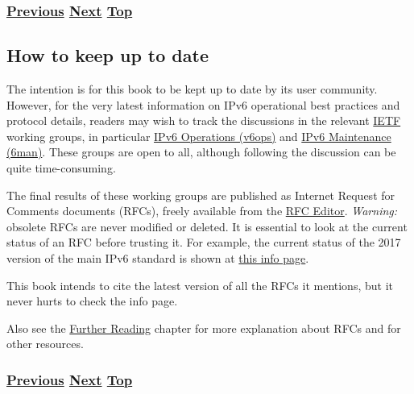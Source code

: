 \documentclass[
]{article}
\begin{document}
\subsubsection{\texorpdfstring{\hyperref[how-an-application-programmer-sees-ipv6]{Previous}
\hyperref[how-to-keep-up-to-date]{Next}
\hyperref[introduction-and-foreword]{Top}}{Previous Next Top}}\label{previous-next-top-3}

\pagebreak

\subsection{How to keep up to date}\label{how-to-keep-up-to-date}

The intention is for this book to be kept up to date by its user
community. However, for the very latest information on IPv6 operational
best practices and protocol details, readers may wish to track the
discussions in the relevant \href{https://www.ietf.org}{IETF} working
groups, in particular
\href{https://datatracker.ietf.org/wg/v6ops/about/}{IPv6 Operations
(v6ops)} and \href{https://datatracker.ietf.org/wg/6man/about/}{IPv6
Maintenance (6man)}. These groups are open to all, although following
the discussion can be quite time-consuming.

The final results of these working groups are published as Internet
Request for Comments documents (RFCs), freely available from the
\href{https://www.rfc-editor.org/}{RFC Editor}. \emph{Warning:} obsolete
RFCs are never modified or deleted. It is essential to look at the
current status of an RFC before trusting it. For example, the current
status of the 2017 version of the main IPv6 standard is shown at
\href{https://www.rfc-editor.org/info/rfc8200}{this info page}.

This book intends to cite the latest version of all the RFCs it
mentions, but it never hurts to check the info page.

Also see the \hyperref[further-reading]{Further Reading} chapter for
more explanation about RFCs and for other resources.

\subsubsection{\texorpdfstring{\hyperref[how-a-network-operations-center-sees-ipv6]{Previous}
\hyperref[how-to-contribute]{Next}
\hyperref[introduction-and-foreword]{Top}}{Previous Next Top}}\label{previous-next-top-4}

\pagebreak
\end{document}
